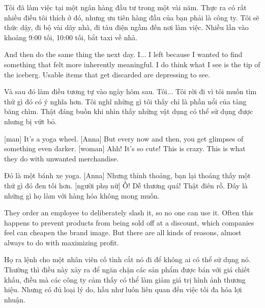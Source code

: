 \documentclass[a4paper]{article}
\begin{document}
	\begin{vietnamese-v2}
		Tôi đã làm việc tại một ngân hàng đầu tư trong một vài năm.
		Thực ra có rất nhiều điều tôi thích ở đó, nhưng ưu tiên hàng đầu của bạn phải là công ty.
		Tôi sẽ thức dậy, đi bộ vài dãy nhà, đi tàu điện ngầm đến nơi làm việc.
		Nhiều lần vào khoảng 9:00 tối, 10:00 tối, bắt taxi về nhà.
	\end{vietnamese-v2}
	
	And then do the same thing the next day.
	I... I left because I wanted to find something that felt more inherently meaningful.
	I do think what I see is the tip of the iceberg.
	Usable items that get discarded are depressing to see.
	
	\begin{vietnamese-v2}
		Và sau đó làm điều tương tự vào ngày hôm sau.
		Tôi... Tôi rời đi vì tôi muốn tìm thứ gì đó có ý nghĩa hơn.
		Tôi nghĩ những gì tôi thấy chỉ là phần nổi của tảng băng chìm.
		Thật đáng buồn khi nhìn thấy những vật dụng có thể sử dụng được nhưng bị vứt bỏ.
	\end{vietnamese-v2}
	
	[man] It's a yoga wheel.
	[Anna] But every now and then, you get glimpses of something even darker.
	[woman] Ahh! It's so cute!
	This is crazy. This is what they do with unwanted merchandise.
	
	\begin{vietnamese-v2}
		 Đó là một bánh xe yoga.
		[Anna] Nhưng thỉnh thoảng, bạn lại thoáng thấy một thứ gì đó đen tối hơn.
		[người phụ nữ] Ồ! Dễ thương quá!
		Thật điên rồ. Đây là những gì họ làm với hàng hóa không mong muốn.
	\end{vietnamese-v2}
	
	They order an employee to deliberately slash it, so no one can use it.
	Often this happens to prevent products from being sold off at a discount, which companies feel can cheapen the brand image.
	But there are all kinds of reasons, almost always to do with maximizing profit.
	
	\begin{vietnamese-v2}
		Họ ra lệnh cho một nhân viên cố tình cắt nó đi để không ai có thể sử dụng nó.
		Thường thì điều này xảy ra để ngăn chặn các sản phẩm được bán với giá chiết khấu, điều mà các công ty cảm thấy có thể làm giảm giá trị hình ảnh thương hiệu.
		Nhưng có đủ loại lý do, hầu như luôn liên quan đến việc tối đa hóa lợi nhuận.
	\end{vietnamese-v2}
	
\end{document}

